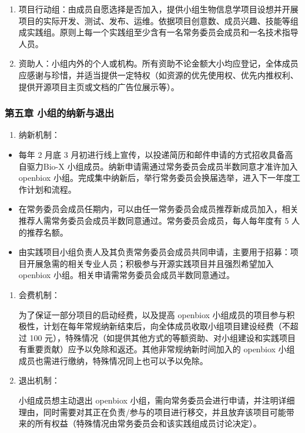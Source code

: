 \documentclass[]{article}
\providecommand{\tightlist}{%
  \setlength{\itemsep}{0pt}\setlength{\parskip}{0pt}}
\begin{document}
\begin{enumerate}
\def\labelenumi{\arabic{enumi}.}
\setcounter{enumi}{2}
\item
  项目行动组：由成员自愿选择是否加入，提供小组生物信息学项目设想并开展项目的实际开发、测试、发布、运维。依据项目创意数、成员兴趣、技能等组成实践组。原则上每一个实践组至少含有一名常务委员会成员和一名技术指导人员。
\item
  资助人：小组内外的个人或机构。所有资助不论金额大小均应登记，全体成员应感谢与珍惜，并适当提供一定特权（如资源的优先使用权、优先内推权利、提供开源项目主页或文档的广告位展示等）。
\end{enumerate}

\subsubsection{第五章 小组的纳新与退出}\label{-}

\begin{enumerate}
\def\labelenumi{\arabic{enumi}.}
\tightlist
\item
  纳新机制：
\end{enumerate}

\begin{itemize}
\item
  每年 2 月底 3
  月初进行线上宣传，以投递简历和邮件申请的方式招收具备高自驱力Bio-X
  小组成员。纳新申请需通过常务委员会成员半数同意才准许加入 openbiox
  小组。完成集中纳新后，举行常务委员会换届选举，进入下一年度工作计划和流程。
\item
  在常务委员会成员任期内，可以由任一常务委员会成员推荐新成员加入，相关推荐人需常务委员会成员半数同意通过。常务委员会成员，每人每年度有
  5 人的推荐名额。
\item
  由实践项目小组负责人及其负责常务委员会成员共同申请，主要用于招募：项目开展急需的相关专业人员；积极参与开源实践项目并且强烈希望加入
  openbiox 小组。相关申请需常务委员会成员半数同意通过。
\end{itemize}

\begin{enumerate}
\def\labelenumi{\arabic{enumi}.}
\setcounter{enumi}{1}
\item
  会费机制：

  为了保证一部分项目的启动经费，以及提高 openbiox
  小组成员的项目参与积极性，计划在每年常规纳新结束后，向全体成员收取小组项目建设经费（不超过
  100
  元），特殊情况（如提供其他方式的等额资助、对小组建设和实践项目有重要贡献）应予以免除和返还。其他非常规纳新时间加入的
  openbiox 小组成员也需进行缴纳，特殊情况同上也可以予以免除。
\item
  退出机制：

  小组成员想主动退出 openbiox
  小组，需向常务委员会进行申请，并注明详细理由，同时需要对其正在负责/参与的项目进行移交，并且放弃该项目可能带来的所有权益（特殊情况由常务委员会和该实践组成员讨论决定）。
\end{enumerate}
\end{document}
